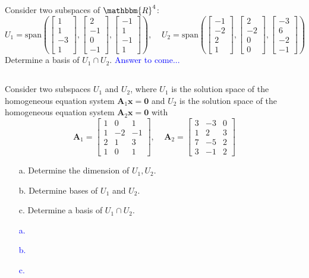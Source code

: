 \documentclass[a4paper,12pt]{article}
\newcommand{\R}{\mathbbm{R}}
\newcommand{\M}[1]{ \begin{bmatrix} #1 \end{bmatrix} }
\newcommand{\vecx}{\textbf{x}}
\newcommand{\veco}{\textbf{0}}
\newcommand{\matA}{\textbf{A}}
\begin{document}
\subsection{}
Consider two subspaces of $\R^4$:
$$
U_1 = \textrm{span}\left( \M{1\\1\\-3\\1}, \M{2\\-1\\0\\-1}, \M{-1\\1\\-1\\1} \right), \;\;\;\;
U_2 = \textrm{span}\left( \M{-1\\-2\\2\\1}, \M{2\\-2\\0\\0}, \M{-3\\6\\-2\\-1} \right)
$$
Determine a basis of $U_1 \cap U_2$.
\textcolor{blue}{
Answer to come...
}
\subsection{}
Consider two subspaces $U_1$ and $U_2$, where $U_1$ is the solution space of the homogeneous equation system $\matA_1 \vecx = \veco$ and $U_2$ is the solution space of the homogeneous equation system $\matA_2 \vecx = \veco$ with
$$\matA_1 = \M{1&0&1\\1&-2&-1\\2&1&3\\1&0&1}, \;\;\;\; \matA_2 = \M{3&-3&0\\1&2&3\\7&-5&2\\3&-1&2}$$
\begin{itemize}
 \item [a.] Determine the dimension of $U_1,U_2$.
 \item [b.] Determine bases of $U_1$ and $U_2$.
 \item [c.] Determine a basis of $U_1 \cap U_2$.
\end{itemize}
\textcolor{blue}{
\begin{itemize}
 \item [a.] 
 \item [b.] 
 \item [c.] 
\end{itemize}
}
\end{document}
